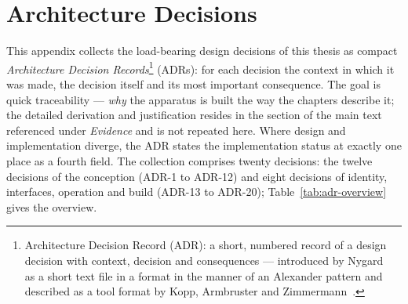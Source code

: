 \chapter{Architecture Decisions}\label{app:adr}

This appendix collects the load-bearing design decisions of this thesis as compact
\emph{Architecture Decision Records}\footnote{Architecture Decision Record (ADR): a short, numbered
record of a design decision with context, decision and consequences --- introduced by
Nygard~\cite{nygard2011adr} as a short text file in a format in the manner of an Alexander pattern and
described as a tool format by Kopp, Armbruster and Zimmermann~\cite{kopp2018madr}.} (ADRs): for each
decision the context in which it was made, the decision itself and its most important consequence. The
goal is quick traceability --- \emph{why} the apparatus is built the way the chapters describe it; the
detailed derivation and justification resides in the section of the main text referenced under
\emph{Evidence} and is not repeated here. Where design and implementation diverge, the ADR states the
implementation status at exactly one place as a fourth field. The collection comprises twenty
decisions: the twelve decisions of the conception (ADR-1 to ADR-12) and eight decisions of identity,
interfaces, operation and build (ADR-13 to ADR-20); Table~\ref{tab:adr-overview} gives the overview.

